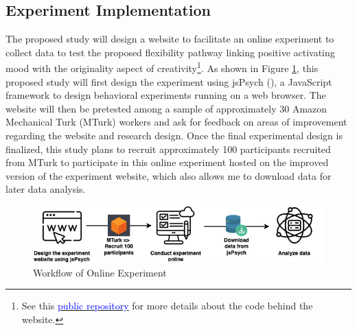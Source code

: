 \documentclass[../MA_Thesis.tex]{subfiles}
\begin{document}
\subsection*{Experiment Implementation}
The proposed study will design a website to facilitate an online experiment to collect data to test the proposed flexibility pathway linking positive activating mood with the originality aspect of creativity\footnote{See this \href{https://github.com/cty20010831/incomplete_drawing_task}{\textcolor{blue}{public repository}} for more details about the code behind the website.}. As shown in Figure \ref{fig: Workflow of Online Experiment}, this proposed study will first design the experiment using jsPsych (\cite{leeuw_jspsych_2023}), a JavaScript framework to design behavioral experiments running on a web browser. The website will then be pretested among a sample of approximately 30 Amazon Mechanical Turk (MTurk) workers and ask for feedback on areas of improvement regarding the website and research design. Once the final experimental design is finalized, this study plans to recruit approximately 100 participants recruited from MTurk to participate in this online experiment hosted on the improved version of the experiment website, which also allows me to download data for later data analysis.

\begin{figure}
    \centering
    \includegraphics[width=0.8\linewidth, keepaspectratio]{drawio/Workflow.png}
    \caption{Workflow of Online Experiment}
    \label{fig: Workflow of Online Experiment}
\end{figure}
\end{document}
